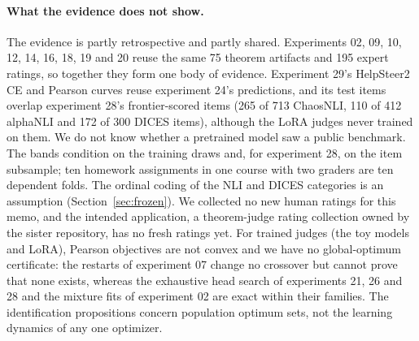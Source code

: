 \paragraph{What the evidence does not show.}
The evidence is partly retrospective and partly shared.
Experiments 02, 09, 10, 12, 14, 16, 18, 19 and 20 reuse the same 75 theorem artifacts and 195 expert ratings, so together they form one body of evidence.
Experiment 29's HelpSteer2 CE and Pearson curves reuse experiment 24's predictions, and its test items overlap experiment 28's frontier-scored items (265 of 713 ChaosNLI, 110 of 412 alphaNLI and 172 of 300 DICES items), although the LoRA judges never trained on them.
We do not know whether a pretrained model saw a public benchmark.
The bands condition on the training draws and, for experiment 28, on the item subsample; ten homework assignments in one course with two graders are ten dependent folds.
The ordinal coding of the NLI and DICES categories is an assumption (Section~\ref{sec:frozen}).
We collected no new human ratings for this memo, and the intended application, a theorem-judge rating collection owned by the sister repository, has no fresh ratings yet.
For trained judges (the toy models and LoRA), Pearson objectives are not convex and we have no global-optimum certificate: the restarts of experiment 07 change no crossover but cannot prove that none exists, whereas the exhaustive head search of experiments 21, 26 and 28 and the mixture fits of experiment 02 are exact within their families.
The identification propositions concern population optimum sets, not the learning dynamics of any one optimizer.

